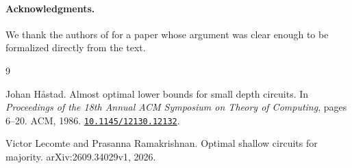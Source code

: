 \documentclass[11pt]{article}
\newcommand{\doi}[1]{\href{https://doi.org/#1}{\nolinkurl{#1}}}
\begin{document}
\paragraph{Acknowledgments.} We thank the authors of \citet{LR26} for a paper whose argument was clear enough to be formalized directly from the text.

\begin{thebibliography}{9}

Johan H{\aa}stad.
\newblock Almost optimal lower bounds for small depth circuits.
\newblock In \emph{Proceedings of the 18th Annual ACM Symposium on Theory of Computing}, pages 6--20. ACM, 1986.
\newblock \doi{10.1145/12130.12132}.

Victor Lecomte and Prasanna Ramakrishnan.
\newblock Optimal shallow circuits for majority.
\newblock arXiv:2609.34029v1, 2026.

\end{thebibliography}
\end{document}
